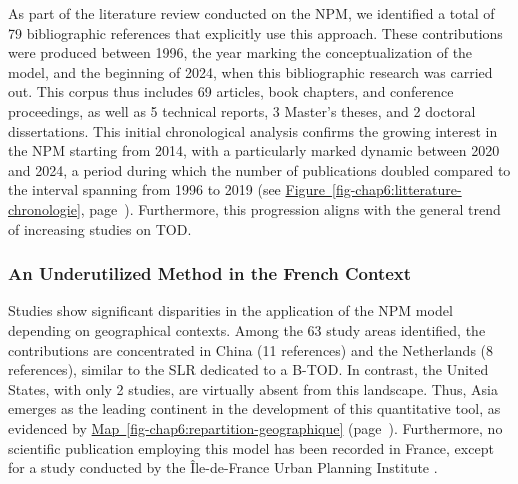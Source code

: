 \begin{refsegment}
As part of the literature review conducted on the \acrshort{NPM}, we identified a total of 79 bibliographic references that explicitly use this approach. These contributions were produced between 1996, the year marking the conceptualization of the model, and the beginning of 2024, when this bibliographic research was carried out. This corpus thus includes 69 articles, book chapters, and conference proceedings, as well as 5 technical reports, 3 Master's theses, and 2 doctoral dissertations. This initial chronological analysis confirms the growing interest in the \acrshort{NPM} starting from 2014, with a particularly marked dynamic between 2020 and 2024, a period during which the number of publications doubled compared to the interval spanning from 1996 to 2019 (see \hyperref[fig-chap6:litterature-chronologie]{Figure~\ref{fig-chap6:litterature-chronologie}}, page~\pageref{fig-chap6:litterature-chronologie}). Furthermore, this progression aligns with the general trend of increasing studies on \acrshort{TOD}.%

\subsubsection*{An Underutilized Method in the French Context
    \label{chap6:litterature-geographie}
    }

Studies show significant disparities in the application of the \acrshort{NPM} model depending on geographical contexts. Among the 63 study areas identified, the contributions are concentrated in China (11 references) and the Netherlands (8 references), similar to the \acrfull{SLR} dedicated to a \acrfull{B-TOD}. In contrast, the United States, with only 2 studies, are virtually absent from this landscape. Thus, Asia emerges as the leading continent in the development of this quantitative tool, as evidenced by \hyperref[fig-chap6:repartition-geographique]{Map~\ref{fig-chap6:repartition-geographique}} (page~\pageref{fig-chap6:repartition-geographique}). Furthermore, no scientific publication employing this model has been recorded in France, except for a study conducted by the Île-de-France Urban Planning Institute \textcolor{blue}{\autocite[2]{iau_articulation_2017}}.%


\end{refsegment}
